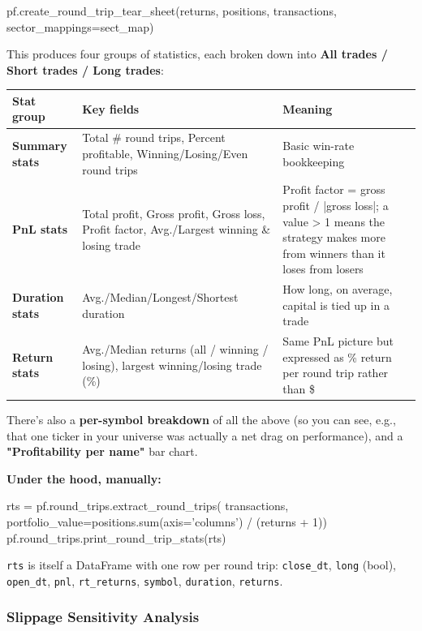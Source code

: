 \documentclass[12pt,openany]{book}
\theoremstyle{definition}
\theoremstyle{remark}
\begin{document}
\begin{python}
pf.create_round_trip_tear_sheet(returns, positions, transactions, sector_mappings=sect_map)
\end{python}

This produces four groups of statistics, each broken down into \textbf{All trades / Short trades / Long trades}:

\begin{longtable}{@{}L{0.30\textwidth}L{0.30\textwidth}L{0.30\textwidth}@{}}
\toprule
\textbf{Stat group} & \textbf{Key fields} & \textbf{Meaning} \\
\midrule
\textbf{Summary stats} & Total \# round trips, Percent profitable, Winning/Losing/Even round trips & Basic win-rate bookkeeping \\
\textbf{PnL stats} & Total profit, Gross profit, Gross loss, Profit factor, Avg./Largest winning \& losing trade & Profit factor = gross profit / |gross loss|; a value > 1 means the strategy makes more from winners than it loses from losers \\
\textbf{Duration stats} & Avg./\allowbreak Median/\allowbreak Longest/\allowbreak Shortest duration & How long, on average, capital is tied up in a trade \\
\textbf{Return stats} & Avg./Median returns (all / winning / losing), largest winning/losing trade (\%) & Same PnL picture but expressed as \% return per round trip rather than \$ \\
\bottomrule
\end{longtable}

There's also a \textbf{per-symbol breakdown} of all the above (so you can see, e.g., that one ticker in your universe was actually a net drag on performance), and a \textbf{"Profitability per name"} bar chart.

\textbf{Under the hood, manually:}

\begin{python}
rts = pf.round_trips.extract_round_trips(
    transactions, portfolio_value=positions.sum(axis='columns') / (returns + 1))
pf.round_trips.print_round_trip_stats(rts)
\end{python}

\texttt{rts} is itself a DataFrame with one row per round trip: \texttt{close\_dt}, \texttt{long} (bool), \texttt{open\_dt}, \texttt{pnl}, \texttt{rt\_returns}, \texttt{symbol}, \texttt{duration}, \texttt{returns}.
\subsubsection{Slippage Sensitivity Analysis}
\end{document}
